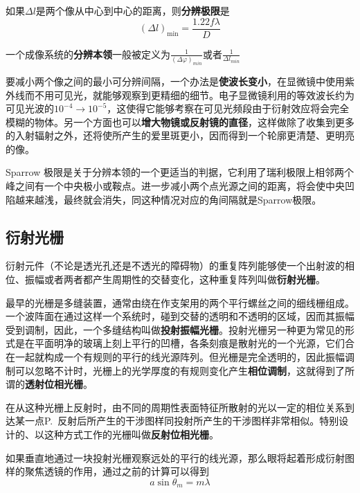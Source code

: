 \documentclass[UTF8]{ctexart}
\begin{document}
\noindent 如果$ \Delta l $是两个像从中心到中心的距离，则\textbf{分辨极限}是
	\begin{equation}
	(\Delta l)_{\min }=\frac{1.22 f \lambda}{D}
	\end{equation}
	
\noindent 一个成像系统的\textbf{分辨本领}一般被定义为$ \frac{1}{(\Delta \varphi)_{min}} $或者$ \frac{1}{\Delta l_{min}} $

	要减小两个像之间的最小可分辨间隔，一个办法是\textbf{使波长变小}，在显微镜中使用紫外线而不用可见光，就能够观察到更精细的细节。电子显微镜利用的等效波长约为可见光波的$ 10^{-4} \rightarrow 10^{-5} $，这使得它能够考察在可见光频段由于衍射效应将会完全模糊的物体。另一个方面也可以\textbf{增大物镜或反射镜的直径}，这样做除了收集到更多的入射辐射之外，还将使所产生的爱里斑更小，因而得到一个轮廓更清楚、更明亮的像。
	
	Sparrow 极限是关于分辨本领的一个更适当的判据，它利用了瑞利极限上相邻两个峰之间有一个中央极小或鞍点。进一步减小两个点光源之间的距离，将会使中央凹陷越来越浅，最终就会消失，同这种情况对应的角间隔就是Sparrow极限。
	
	\subsection{衍射光栅}
	
	衍射元件（不论是透光孔还是不透光的障碍物）的重复阵列能够使一个出射波的相位、振幅或者两者都产生周期性的交替变化，这种重复阵列叫做\textbf{衍射光栅}。
	
	最早的光栅是多缝装置，通常由绕在作支架用的两个平行螺丝之间的细线栅组成。一个波阵面在通过这样一个系统时，碰到交替的透明和不透明的区域，因而其振幅受到调制，因此，一个多缝结构叫做\textbf{投射振幅光栅}。投射光栅另一种更为常见的形式是在平面明净的玻璃上刻上平行的凹槽，各条刻痕是散射光的一个光源，它们合在一起就构成一个有规则的平行的线光源阵列。但光栅是完全透明的，因此振幅调制可以忽略不计时，光栅上的光学厚度的有规则变化产生\textbf{相位调制}，这就得到了所谓的\textbf{透射位相光栅}。
	
	在从这种光栅上反射时，由不同的周期性表面特征所散射的光以一定的相位关系到达某一点P.\ 反射后所产生的干涉图样同投射所产生的干涉图样非常相似。特别设计的、以这种方式工作的光栅叫做\textbf{反射位相光栅}。
	
	如果垂直地通过一块投射光栅观察远处的平行的线光源，那么眼将起着形成衍射图样的聚焦透镜的作用，通过之前的计算可以得到
	\begin{equation}
		a \sin \theta_{m}= m \lambda
	\end{equation}
	
\end{document}
